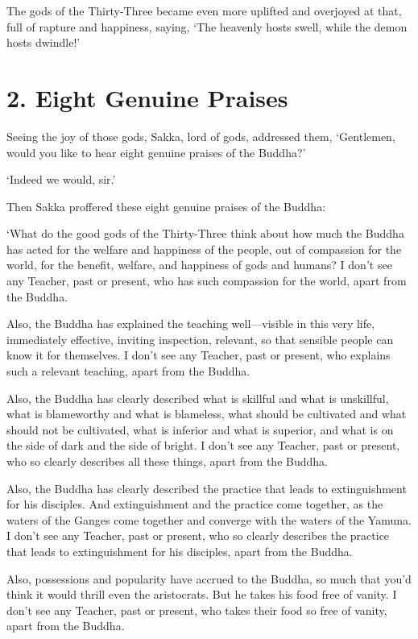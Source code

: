 \documentclass[12pt,openany]{book}%
\begin{document}
The gods of the Thirty-Three became even more uplifted and overjoyed at that, full of rapture and happiness, saying, ‘The heavenly hosts swell, while the demon hosts dwindle!’ 

\section*{2. Eight Genuine Praises }

Seeing the joy of those gods, Sakka, lord of gods, addressed them, ‘Gentlemen, would you like to hear eight genuine praises of the Buddha?’ 

‘Indeed we would, sir.’ 

Then Sakka proffered these eight genuine praises of the Buddha: 

‘What do the good gods of the Thirty-Three think about how much the Buddha has acted for the welfare and happiness of the people, out of compassion for the world, for the benefit, welfare, and happiness of gods and humans? I don’t see any Teacher, past or present, who has such compassion for the world, apart from the Buddha. 

Also, the Buddha has explained the teaching well—visible in this very life, immediately effective, inviting inspection, relevant, so that sensible people can know it for themselves. I don’t see any Teacher, past or present, who explains such a relevant teaching, apart from the Buddha. 

Also, the Buddha has clearly described what is skillful and what is unskillful, what is blameworthy and what is blameless, what should be cultivated and what should not be cultivated, what is inferior and what is superior, and what is on the side of dark and the side of bright. I don’t see any Teacher, past or present, who so clearly describes all these things, apart from the Buddha. 

Also, the Buddha has clearly described the practice that leads to extinguishment for his disciples. And extinguishment and the practice come together, as the waters of the Ganges come together and converge with the waters of the Yamuna. I don’t see any Teacher, past or present, who so clearly describes the practice that leads to extinguishment for his disciples, apart from the Buddha. 

Also, possessions and popularity have accrued to the Buddha, so much that you’d think it would thrill even the aristocrats. But he takes his food free of vanity. I don’t see any Teacher, past or present, who takes their food so free of vanity, apart from the Buddha. 
\end{document}
